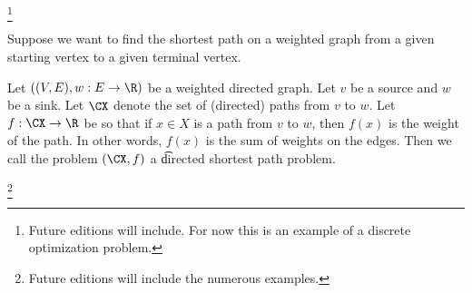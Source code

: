 
\footnote{Future editions will include. For now this is an example of a discrete optimization problem.}


Suppose we want to find the shortest path on a weighted graph from a given starting vertex to a given terminal vertex.

Let $((V, E), w: E \to \R)$ be a weighted directed graph.
Let $v$ be a source and $w$ be a sink.
Let $\CX$ denote the set of (directed) paths from $v$ to $w$.
Let $f: \CX \to \R$ be so that if $x \in X$ is a path from $v$ to $w$, then $f(x)$ is the weight of the path.
In other words, $f(x)$ is the sum of weights on the edges.
Then we call the problem $(\CX, f)$ a \t{directed shortest path problem}.

\footnote{Future editions will include the numerous examples.}

\blankpage
